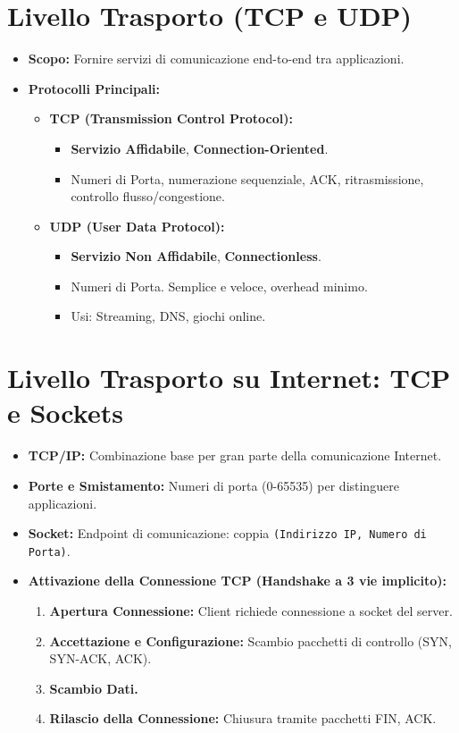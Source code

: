 \documentclass{article}
\begin{document}
\section{Livello Trasporto (TCP e UDP)}
\begin{itemize}
    \item \textbf{Scopo:} Fornire servizi di comunicazione end-to-end tra applicazioni.
    \item \textbf{Protocolli Principali:}
    \begin{itemize}
        \item \textbf{TCP (Transmission Control Protocol):}
        \begin{itemize}
            \item \textbf{Servizio Affidabile}, \textbf{Connection-Oriented}.
            \item Numeri di Porta, numerazione sequenziale, ACK, ritrasmissione, controllo flusso/congestione.
        \end{itemize}
        \item \textbf{UDP (User Data Protocol):}
        \begin{itemize}
            \item \textbf{Servizio Non Affidabile}, \textbf{Connectionless}.
            \item Numeri di Porta. Semplice e veloce, overhead minimo.
            \item Usi: Streaming, DNS, giochi online.
        \end{itemize}
    \end{itemize}
\end{itemize}

\section{Livello Trasporto su Internet: TCP e Sockets}
\begin{itemize}
    \item \textbf{TCP/IP:} Combinazione base per gran parte della comunicazione Internet.
    \item \textbf{Porte e Smistamento:} Numeri di porta (0-65535) per distinguere applicazioni.
    \item \textbf{Socket:} Endpoint di comunicazione: coppia \texttt{(Indirizzo IP, Numero di Porta)}.
    \item \textbf{Attivazione della Connessione TCP (Handshake a 3 vie implicito):}
    \begin{enumerate}
        \item \textbf{Apertura Connessione:} Client richiede connessione a socket del server.
        \item \textbf{Accettazione e Configurazione:} Scambio pacchetti di controllo (SYN, SYN-ACK, ACK).
        \item \textbf{Scambio Dati.}
        \item \textbf{Rilascio della Connessione:} Chiusura tramite pacchetti FIN, ACK.
    \end{enumerate}
\end{itemize}
\end{document}

